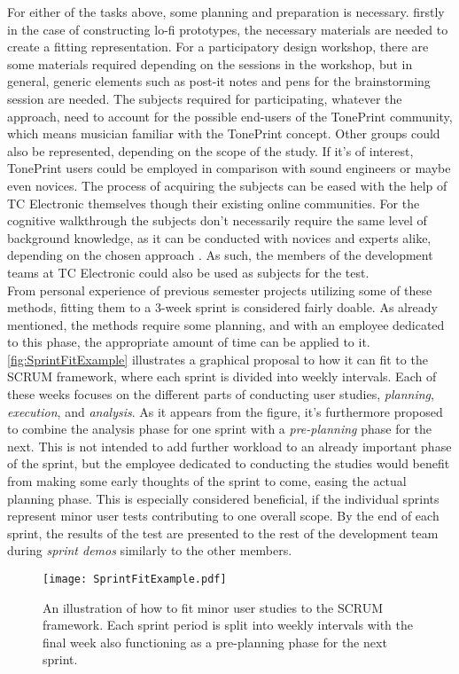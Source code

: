 \noindent
For either of the tasks above, some planning and preparation is necessary. firstly in the case of constructing lo-fi prototypes, the necessary materials are needed to create a fitting representation. For a participatory design workshop, there are some materials required depending on the sessions in the workshop, but in general, generic elements such as post-it notes and pens for the brainstorming session are needed. The subjects required for participating, whatever the approach, need to account for the possible end-users of the TonePrint community, which means musician familiar with the TonePrint concept. Other groups could also be represented, depending on the scope of the study. If it's of interest, TonePrint users could be employed in comparison with sound engineers or maybe even novices. The process of acquiring the subjects can be eased with the help of TC Electronic themselves though their existing online communities. For the cognitive walkthrough the subjects don't necessarily require the same level of background knowledge, as it can be conducted with novices and experts alike, depending on the chosen approach \parencite{WEB:CognitiveWalkthrough}. As such, the members of the development teams at TC Electronic could also be used as subjects for the test.\\

\noindent
From personal experience of previous semester projects utilizing some of these methods, fitting them to a 3-week sprint is considered fairly doable. As already mentioned, the methods require some planning, and with an employee dedicated to this phase, the appropriate amount of time can be applied to it. \autoref{fig:SprintFitExample} illustrates a graphical proposal to how it can fit to the SCRUM framework, where each sprint is divided into weekly intervals. Each of these weeks focuses on the different parts of conducting user studies, \textit{planning}, \textit{execution}, and \textit{analysis}. As it appears from the figure, it's furthermore proposed to combine the analysis phase for one sprint with a \textit{pre-planning} phase for the next. This is not intended to add further workload to an already important phase of the sprint, but the employee dedicated to conducting the studies would benefit from making some early thoughts of the sprint to come, easing the actual planning phase. This is especially considered beneficial, if the individual sprints represent minor user tests contributing to one overall scope. By the end of each sprint, the results of the test are presented to the rest of the development team during \textit{sprint demos} similarly to the other members.
%
\begin{figure}[H]
	\centering
	\texttt{[image: SprintFitExample.pdf]}
	\caption{An illustration of how to fit minor user studies to the SCRUM framework. Each sprint period is split into weekly intervals with the final week also functioning as a pre-planning phase for the next sprint.}
	\label{fig:SprintFitExample}
\end{figure}


